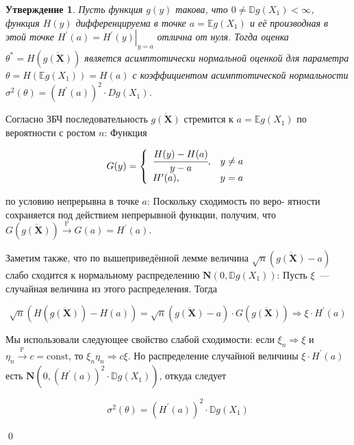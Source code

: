 \documentclass[oneside,final,14pt]{extreport}
\renewenvironment{proof}{{\bfseries Доказательство.}}{\qed}
\theoremstyle{plain}
\newtheorem*{thm*}{Утверждение}
\theoremstyle{definition}
\theoremstyle{named}
\begin{document}
\begin{thm*}
Пусть функция $g(y)$ такова, что $0 \neq \mathbb{D} g\left(X_{1}\right)<\infty$, функция $H(y)$ дифференцируема в точке $a=\mathbb{E} g\left(X_{1}\right)$ и её производная в этой точке $H^{\prime}(a)=\left.H^{\prime}(y)\right|_{y=a}$ отлична от нуля. Тогда оценка $\theta^{*}=H(\overline{g(\mathbf{X})})$
является асимптотически нормальной
оценкой для параметра $\theta=H\left(\mathbb{E} g\left(X_{1}\right)\right)=H(a)$ с коэффициентом асимптотической нормальности $\sigma^{2}(\theta)=\left(H^{\prime}(a)\right)^{2} \cdot D g\left(X_{1}\right)$.
\end{thm*}

\begin{proof}
Согласно ЗБЧ последовательность $\overline{g(\mathbf{X})}$ стремится к $a=\mathbb{E} g\left(X_{1}\right)$ по вероятности с ростом $n$: Функция

\begin{equation*}
    G(y)=\left\{\begin{array}{ll}
    \cfrac{H(y)-H(a)}{y-a}, & y \neq a \\
    H^{\prime}(a), & y=a
    \end{array}\right.  
\end{equation*}

по условию непрерывна в точке $a$: Поскольку сходимость по веро-
ятности сохраняется под действием непрерывной функции, получим,
что $G(\overline{g(\mathbf{X})}) \xrightarrow[]{\mathbb{P}} G(a)=H^{\prime}(a)$.

Заметим также, что по вышеприведённой лемме величина $\sqrt{n}(\overline{g(\mathbf{X})}-a)$ слабо сходится
к нормальному распределению $\mathbf{N}(0, \mathbb{D} g(X_{1}))$: Пусть $\xi$~--- случайная величина
из этого распределения. Тогда

\begin{equation*}
    \sqrt{n}(H(\overline{g(\mathbf{X})})-H(a))=\sqrt{n}(\overline{g(\mathbf{X})}-a) \cdot G(\overline{g(\mathbf{X})}) \Rightarrow \xi \cdot H^{\prime}(a)
\end{equation*}

Мы использовали следующее свойство слабой сходимости: если $\xi_{n} \Rightarrow \xi$ и $\eta_{n} \xrightarrow[]{\mathbb{P}} c=\mathrm{const}$, то $\xi_{n} \eta_{n} \Rightarrow c \xi$. Но распределение случайной величины $\xi \cdot H^{\prime}(a)$ есть $\mathbf{N}(0,(H^{\prime}(a))^{2} \cdot \mathbb{D} g(X_{1}))$, откуда следует

\begin{equation*}
    \sigma^{2}(\theta)=\left(H^{\prime}(a)\right)^{2} \cdot \mathbb{D} g\left(X_{1}\right)
\end{equation*}

\end{proof}
\end{document}
